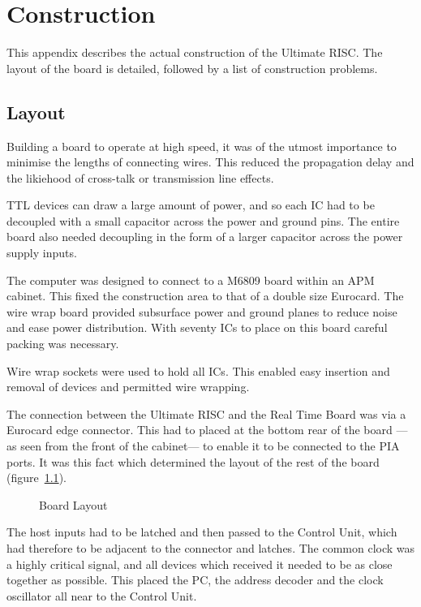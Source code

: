 
\chapter{Construction}

This appendix describes the actual construction of the Ultimate RISC.
The layout of the board is detailed, followed by a list of construction problems.

\section{Layout}

Building a board to operate at high speed, it was of the utmost importance to minimise the lengths of connecting wires.
This reduced the propagation delay and the likiehood of cross-talk or transmission line effects.

TTL devices can draw a large amount of power, and so each IC had to be decoupled with a small capacitor across the power and ground pins. 
The entire board also needed decoupling in the form of a larger capacitor across the power supply inputs.

The computer was designed to connect to a M6809 board within an APM cabinet.
This fixed the construction area to that of a double size Eurocard.
The  wire wrap board provided subsurface power and ground planes to reduce noise and ease power distribution.
With seventy ICs to place on this board careful packing was necessary.

Wire wrap sockets  were used to hold all ICs. This enabled easy insertion and removal of devices and permitted wire wrapping.

The connection between the Ultimate RISC and the Real Time Board was via  a Eurocard edge connector. 
This had to placed at the bottom rear of the board ---as seen from the front of the cabinet--- to enable it to be connected to the PIA ports.
It was this fact which determined the layout of the rest of the board (figure~\ref{fig:layout}).

\begin{figure}
\vspace{10cm}
\caption{Board Layout}
\label{fig:layout}
\end{figure}

The host inputs had to be latched and then passed to the Control Unit, which had therefore to be adjacent to the connector and latches.
The common clock was a highly critical signal, and all devices which received it needed to be as close together as possible.
This placed the PC,  the address decoder and the clock oscillator all near to the Control Unit.

